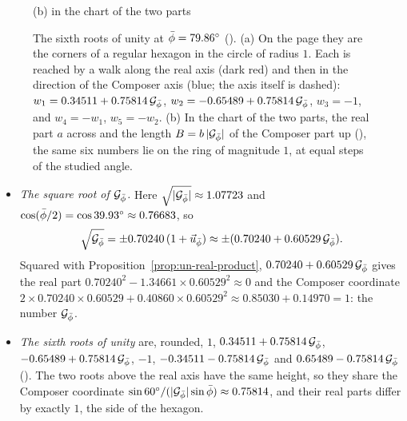\begin{figure}[tb]
\begin{minipage}[b]{0.48\textwidth}
\smallskip
{\small (b) in the chart of the two parts\par}
\end{minipage}
\caption[The sixth roots of unity in a relative plane]{The sixth roots of unity at $\bar{\phi} = 79.86^\circ$ (). (a) On the page they are the corners of a regular hexagon in the circle of radius $1$. Each is reached by a walk along the real axis (dark red) and then in the direction of the Composer axis (blue; the axis itself is dashed): $w_1 = 0.34511 + 0.75814\,\mathcal{G}_{\bar{\phi}}$, $w_2 = -0.65489 + 0.75814\,\mathcal{G}_{\bar{\phi}}$, $w_3 = -1$, and $w_4 = -w_1$, $w_5 = -w_2$. (b) In the chart of the two parts, the real part $a$ across and the length $B = b\,|\mathcal{G}_{\bar{\phi}}|$ of the Composer part up (), the same six numbers lie on the ring of magnitude $1$, at equal steps of the studied angle.}
\label{fig:gn-roots}
\end{figure}

\enlargethispage{2\baselineskip}
\begin{workedexample}
\begin{itemize}
  \item \emph{The square root of $\mathcal{G}_{\bar{\phi}}$.} Here $\sqrt{|\mathcal{G}_{\bar{\phi}}|} \approx 1.07723$ and $\cos(\bar{\phi}/2) = \cos 39.93^\circ \approx 0.76683$, so
  \[
  \sqrt{\mathcal{G}_{\bar{\phi}}} = \pm 0.70240\,(1 + \vec{u}_{\bar{\phi}}) \approx \pm(0.70240 + 0.60529\,\mathcal{G}_{\bar{\phi}}) .
  \]
  Squared with Proposition~\ref{prop:un-real-product}, $0.70240 + 0.60529\,\mathcal{G}_{\bar{\phi}}$ gives the real part $0.70240^2 - 1.34661 \times 0.60529^2 \approx 0$ and the Composer coordinate $2 \times 0.70240 \times 0.60529 + 0.40860 \times 0.60529^2 \approx 0.85030 + 0.14970 = 1$: the number $\mathcal{G}_{\bar{\phi}}$.
  \item \emph{The sixth roots of unity} are, rounded, $1$, $0.34511 + 0.75814\,\mathcal{G}_{\bar{\phi}}$, $-0.65489 + 0.75814\,\mathcal{G}_{\bar{\phi}}$, $-1$, $-0.34511 - 0.75814\,\mathcal{G}_{\bar{\phi}}$ and $0.65489 - 0.75814\,\mathcal{G}_{\bar{\phi}}$ (). The two roots above the real axis have the same height, so they share the Composer coordinate $\sin 60^\circ/(|\mathcal{G}_{\bar{\phi}}|\sin\bar{\phi}) \approx 0.75814$, and their real parts differ by exactly $1$, the side of the hexagon.
\end{itemize}
\end{workedexample}

